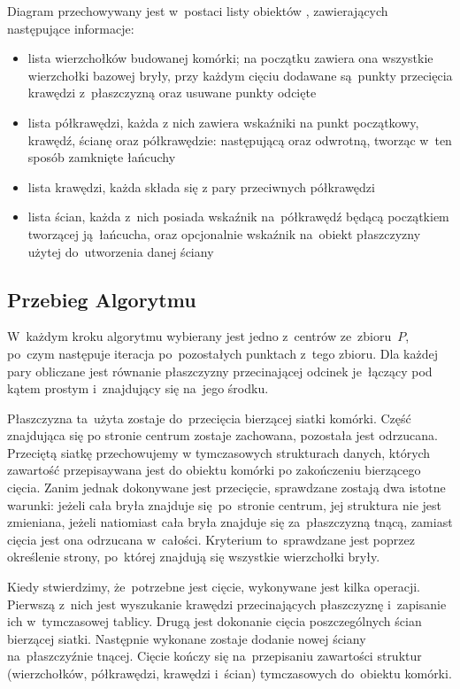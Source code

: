 \documentclass[skorowidz,autorrok,backref,xodstep,oswiadczenie]{wmimgr}
\begin{document}
Diagram przechowywany jest w~postaci listy obiektów , zawierających następujące informacje:
\begin{itemize}
\item
lista wierzchołków budowanej komórki; na początku zawiera ona wszystkie wierzchołki bazowej bryły, przy każdym cięciu dodawane są~punkty przecięcia krawędzi z~płaszczyzną oraz usuwane punkty odcięte
\item
lista półkrawędzi, każda z nich zawiera wskaźniki na punkt początkowy, krawędź, ścianę oraz półkrawędzie: następującą oraz odwrotną, tworząc w~ten sposób zamknięte łańcuchy
\item
lista krawędzi, każda składa się z pary przeciwnych półkrawędzi
\item
lista ścian, każda z~nich posiada wskaźnik na~półkrawędź będącą początkiem tworzącej ją~łańcucha, oraz opcjonalnie wskaźnik na~obiekt płaszczyzny użytej do~utworzenia danej ściany
\end{itemize}

\subsection{Przebieg Algorytmu}

W~każdym kroku algorytmu wybierany jest jedno z~centrów ze~zbioru~$P$, po~czym następuje iteracja po~pozostałych punktach z~tego zbioru. Dla każdej pary obliczane jest równanie płaszczyzny przecinającej odcinek je~łączący pod kątem prostym i~znajdujący się na~jego środku.

Płaszczyzna ta~użyta zostaje do~przecięcia bierzącej siatki komórki. Część znajdująca się po stronie centrum zostaje zachowana, pozostała jest odrzucana. Przeciętą siatkę przechowujemy w tymczasowych strukturach danych, których zawartość przepisaywana jest do obiektu komórki po zakończeniu bierzącego cięcia. Zanim jednak dokonywane jest przecięcie, sprawdzane zostają dwa istotne warunki: jeżeli cała bryła znajduje się~po~stronie centrum, jej struktura nie jest zmieniana, jeżeli natiomiast cała bryła znajduje się za~płaszczyzną tnącą, zamiast cięcia jest ona odrzucana w~całości. Kryterium to~sprawdzane jest poprzez określenie strony, po~której znajdują się wszystkie wierzchołki bryły.

Kiedy stwierdzimy, że~potrzebne jest cięcie, wykonywane jest kilka operacji. Pierwszą z~nich jest wyszukanie krawędzi przecinających płaszczyznę i~zapisanie ich w~tymczasowej tablicy. Drugą jest dokonanie cięcia poszczególnych ścian bierzącej siatki. Następnie wykonane zostaje dodanie nowej ściany na~płaszczyźnie tnącej. Cięcie kończy się na~przepisaniu zawartości struktur (wierzchołków, półkrawędzi, krawędzi i~ścian) tymczasowych do~obiektu komórki.
\end{document}
